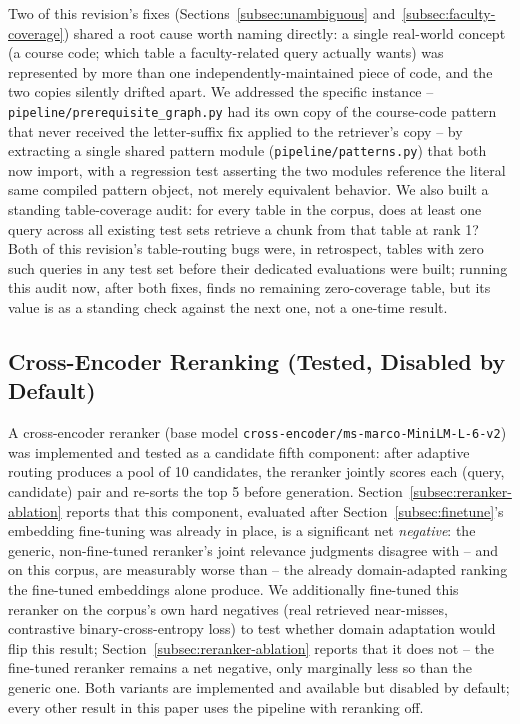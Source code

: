 \documentclass[a4paper,twoside]{article}
\begin{document}
Two of this revision's fixes (Sections~\ref{subsec:unambiguous} and~\ref{subsec:faculty-coverage}) shared a root cause worth naming directly: a single real-world concept (a course code; which table a faculty-related query actually wants) was represented by more than one independently-maintained piece of code, and the two copies silently drifted apart. We addressed the specific instance -- \texttt{pipeline/prerequisite\_graph.py} had its own copy of the course-code pattern that never received the letter-suffix fix applied to the retriever's copy -- by extracting a single shared pattern module (\texttt{pipeline/patterns.py}) that both now import, with a regression test asserting the two modules reference the literal same compiled pattern object, not merely equivalent behavior. We also built a standing table-coverage audit: for every table in the corpus, does at least one query across all existing test sets retrieve a chunk from that table at rank 1? Both of this revision's table-routing bugs were, in retrospect, tables with zero such queries in any test set before their dedicated evaluations were built; running this audit now, after both fixes, finds no remaining zero-coverage table, but its value is as a standing check against the next one, not a one-time result.

\subsection{Cross-Encoder Reranking (Tested, Disabled by Default)}
\label{subsec:reranker}

A cross-encoder reranker (base model \texttt{cross-encoder/ms-marco-MiniLM-L-6-v2}) was implemented and tested as a candidate fifth component: after adaptive routing produces a pool of 10 candidates, the reranker jointly scores each (query, candidate) pair and re-sorts the top 5 before generation. Section~\ref{subsec:reranker-ablation} reports that this component, evaluated after Section~\ref{subsec:finetune}'s embedding fine-tuning was already in place, is a significant net \emph{negative}: the generic, non-fine-tuned reranker's joint relevance judgments disagree with -- and on this corpus, are measurably worse than -- the already domain-adapted ranking the fine-tuned embeddings alone produce. We additionally fine-tuned this reranker on the corpus's own hard negatives (real retrieved near-misses, contrastive binary-cross-entropy loss) to test whether domain adaptation would flip this result; Section~\ref{subsec:reranker-ablation} reports that it does not -- the fine-tuned reranker remains a net negative, only marginally less so than the generic one. Both variants are implemented and available but disabled by default; every other result in this paper uses the pipeline with reranking off.
\end{document}
